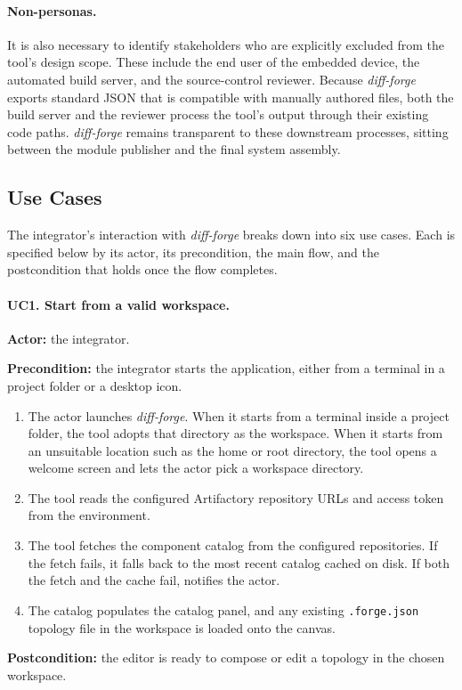 \paragraph{Non-personas.}
It is also necessary to identify stakeholders who are explicitly excluded from the tool's design scope. These include the end user of the embedded device, the automated build server, and the source-control reviewer. Because \textit{diff-forge} exports standard JSON that is compatible with manually authored files, both the build server and the reviewer process the tool's output through their existing code paths. \textit{diff-forge} remains transparent to these downstream processes, sitting between the module publisher and the final system assembly.

\subsection{Use Cases}
\label{sec:use-cases}

The integrator's interaction with \textit{diff-forge} breaks down into six use cases. Each is specified below by its actor, its precondition, the main flow, and the postcondition that holds once the flow completes.

\paragraph{UC1. Start from a valid workspace.}
\textbf{Actor:} the integrator. 

\noindent\textbf{Precondition:} the integrator starts the application, either from a terminal in a project folder or a desktop icon.
\begin{enumerate}
    \item The actor launches \textit{diff-forge}. When it starts from a terminal inside a project folder, the tool adopts that directory as the workspace. When it starts from an unsuitable location such as the home or root directory, the tool opens a welcome screen and lets the actor pick a workspace directory.
    \item The tool reads the configured Artifactory repository URLs and access token from the environment.
    \item The tool fetches the component catalog from the configured repositories. If the fetch fails, it falls back to the most recent catalog cached on disk. If both the fetch and the cache fail, notifies the actor.
    \item The catalog populates the catalog panel, and any existing \texttt{.forge.json} topology file in the workspace is loaded onto the canvas.
\end{enumerate}
\noindent\textbf{Postcondition:} the editor is ready to compose or edit a topology in the chosen workspace.

